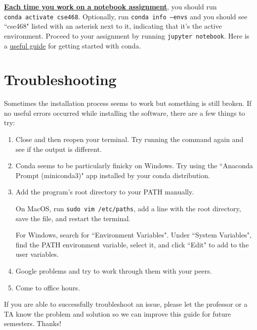 \documentclass[12pt]{article}
\begin{document}
\textbf{\underline{Each time you work on a notebook assignment}}, you should run \\ \texttt{conda activate cse468}. Optionally, run \texttt{conda info --envs} and you should see ``cse468" listed with an asterisk next to it, indicating that it's the active environment. Proceed to your assignment by running \texttt{jupyter notebook}. Here is a \href{https://docs.conda.io/projects/conda/en/latest/user-guide/getting-started.html}{useful guide} for getting started with conda.




\section{Troubleshooting}
Sometimes the installation process seems to work but something is still broken. If no useful errors occurred while installing the software, there are a few things to try:
\begin{enumerate}
\item Close and then reopen your terminal. Try running the command again and see if the output is different.
\item Conda seems to be particularly finicky on Windows. Try using the ``Anaconda Prompt (miniconda3)" app installed by your conda distribution.
\item Add the program's root directory to your PATH manually.

On MacOS, run \texttt{sudo vim /etc/paths}, add a line with the root directory, save the file, and restart the terminal.

For Windows, search for ``Environment Variables". Under ``System Variables", find the PATH environment variable, select it, and click ``Edit" to add to the user variables. 

\item Google problems and try to work through them with your peers.
\item Come to office hours.

\end{enumerate}

If you are able to successfully troubleshoot an issue, please let the professor or a TA know the problem and solution so we can improve this guide for future semesters. Thanks!
\end{document}
